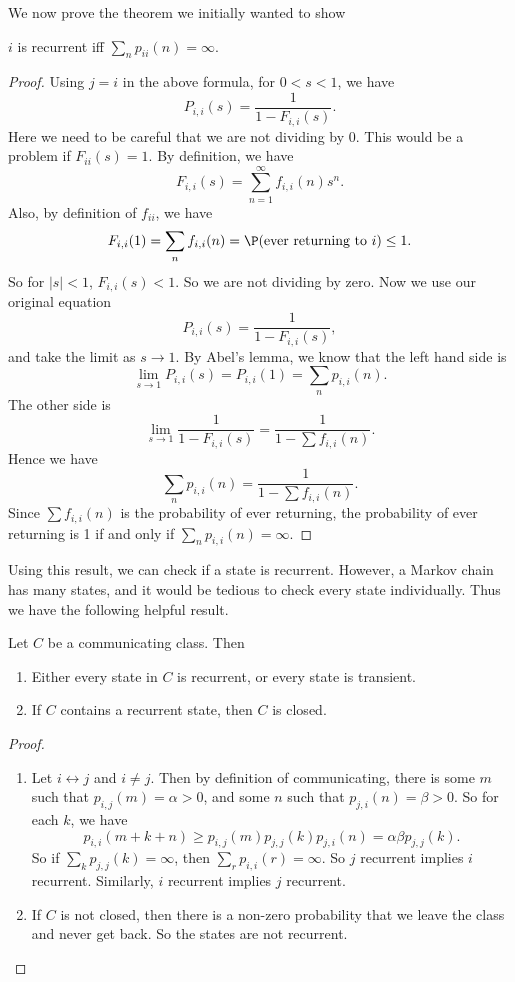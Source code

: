 \documentclass[a4paper]{article}
\begin{document}
We now prove the theorem we initially wanted to show
\begin{thm}
  $i$ is recurrent iff $\sum_n p_{ii}(n) = \infty$.
\end{thm}

\begin{proof}
  Using $j = i$ in the above formula, for $0 < s < 1$, we have
  \[
    P_{i, i}(s) = \frac{1}{1 - F_{i, i} (s)}.
  \]
  Here we need to be careful that we are not dividing by $0$. This would be a problem if $F_{ii}(s) = 1$. By definition, we have
  \[
    F_{i, i}(s) = \sum_{n = 1}^\infty f_{i, i}(n) s^n.
  \]
  Also, by definition of $f_{ii}$, we have
  \[
    F_{i, i}(1) = \sum_n f_{i, i}(n) = \P(\text{ever returning to }i) \leq 1.
  \]
  So for $|s| < 1$, $F_{i, i}(s) < 1$. So we are not dividing by zero. Now we use our original equation
  \[
    P_{i, i}(s) = \frac{1}{1 - F_{i, i} (s)},
  \]
  and take the limit as $s \to 1$. By Abel's lemma, we know that the left hand side is
  \[
    \lim_{s \to 1}P_{i, i}(s) = P_{i, i}(1) = \sum_n p_{i, i}(n).
  \]
  The other side is
  \[
    \lim_{s \to 1}\frac{1}{1 - F_{i, i}(s)} = \frac{1}{1 - \sum f_{i, i}(n)}.
  \]
  Hence we have
  \[
    \sum_n p_{i, i}(n) = \frac{1}{1 - \sum f_{i, i}(n)}.
  \]
  Since $\sum f_{i, i}(n)$ is the probability of ever returning, the probability of ever returning is 1 if and only if $\sum_n p_{i, i}(n) = \infty$.
\end{proof}

Using this result, we can check if a state is recurrent. However, a Markov chain has many states, and it would be tedious to check every state individually. Thus we have the following helpful result.
\begin{thm}
  Let $C$ be a communicating class. Then
  \begin{enumerate}
    \item Either every state in $C$ is recurrent, or every state is transient.
    \item If $C$ contains a recurrent state, then $C$ is closed.
  \end{enumerate}
\end{thm}

\begin{proof}\leavevmode
  \begin{enumerate}
    \item Let $i \leftrightarrow j$ and $i \not =j$. Then by definition of communicating, there is some $m$ such that $p_{i, j}(m) = \alpha > 0$, and some $n$ such that $p_{j, i}(n) = \beta > 0$. So for each $k$, we have
      \[
        p_{i, i}(m + k + n) \geq p_{i, j}(m) p_{j, j}(k) p_{j, i}(n) = \alpha\beta p_{j, j}(k).
      \]
      So if $\sum_k p_{j, j}(k) = \infty$, then $\sum_r p_{i, i}(r) = \infty$. So $j$ recurrent implies $i$ recurrent. Similarly, $i$ recurrent implies $j$ recurrent.
    \item If $C$ is not closed, then there is a non-zero probability that we leave the class and never get back. So the states are not recurrent.\qedhere
  \end{enumerate}
\end{proof}
\end{document}
